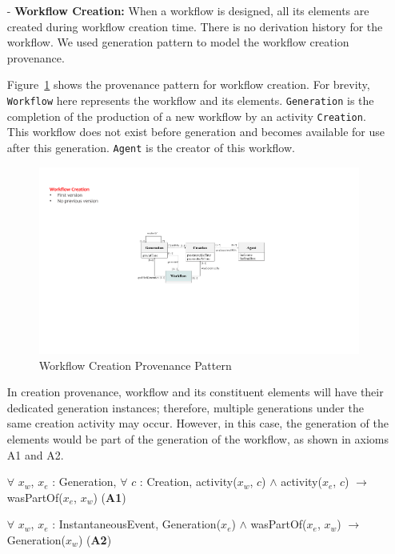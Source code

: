 \documentclass[ao]{iosart2x}
\begin{document}
\begin{itemize}
\item[-]\textbf{Workflow Creation:} When a workflow is designed, all its elements are created during workflow creation time. There is no derivation history for the workflow. We used generation pattern to model the workflow creation provenance. 

Figure~\ref{fig:workflow-creation-provenance} shows the provenance pattern for workflow creation. For brevity, \texttt{Workflow} here represents the workflow and its elements. \texttt{Generation} is the completion of the production of a new workflow by an activity \texttt{Creation}. This workflow does not exist before generation and becomes available for use after this generation. \texttt{Agent} is the creator of this workflow.

\begin{figure}[h]
    \centering
    \includegraphics[width=0.7\linewidth]{figures/workflow-creation-pattern.pdf}
    \caption{Workflow Creation Provenance Pattern}
    \label{fig:workflow-creation-provenance}
\end{figure}

In creation provenance, workflow and its constituent elements will have their dedicated generation instances; therefore, multiple generations under the same creation activity may occur. However, in this case, the generation of the elements would be part of the generation of the workflow, as shown in axioms A1 and A2.  

\begin{center}
    $\forall$ $x_w$, $x_e$ : Generation,
    $\forall$ $c$ : Creation,
    activity($x_w$, $c$) $\wedge$ activity($x_e$, $c$) $\rightarrow$  wasPartOf($x_e$, $x_w$) (\textbf{A1})
\end{center}

\begin{center}
    $\forall$ $x_w$, $x_e$ : InstantaneousEvent,
    Generation($x_e$) $\wedge$ wasPartOf($x_e$, $x_w$)  $\rightarrow$ Generation($x_w$)   (\textbf{A2})
\end{center}


\end{itemize}
\end{document}
